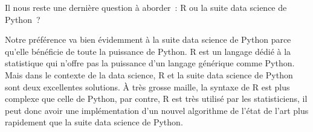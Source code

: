     Il nous reste une dernière question à aborder~: R ou la suite data
science de Python~?

Notre préférence va bien évidemment à la suite data science de Python
parce qu'elle bénéficie de toute la puissance de Python. R est un
langage dédié à la statistique qui n'offre pas la puissance d'un langage
générique comme Python. Mais dans le contexte de la data science, R et
la suite data science de Python sont deux excellentes solutions. À très
grosse maille, la syntaxe de R est plus complexe que celle de Python,
par contre, R est très utilisé par les statisticiens, il peut donc avoir
une implémentation d'un nouvel algorithme de l'état de l'art plus
rapidement que la suite data science de Python.


    
    
    
